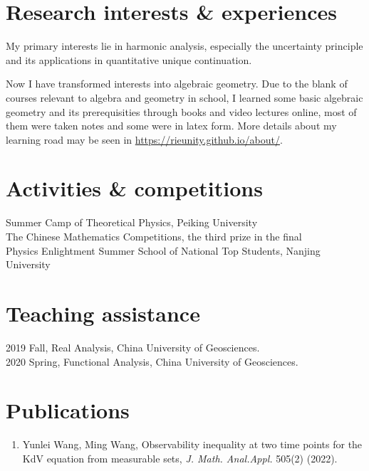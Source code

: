 \documentclass[11pt]{article} %
\begin{document}

\section*{Research interests \& experiences}
My primary interests lie in harmonic analysis, especially the uncertainty principle and its applications in quantitative unique continuation. 

Now I have transformed interests into algebraic geometry. Due to the blank of courses relevant to algebra and geometry in school, I learned some basic algebraic geometry and its prerequisities through books and video lectures online, most of them were taken notes and some were in latex form. More details about my learning road may be seen in \url{https://rieunity.github.io/about/}.

\section*{Activities \& competitions}
 Summer Camp of Theoretical Physics, Peiking University\\
 The Chinese Mathematics Competitions, the third prize  in the final\\
 Physics Enlightment Summer School of National Top Students, Nanjing University


\section*{Teaching assistance}
2019 Fall, Real Analysis, China University of Geosciences. \\
2020 Spring, Functional Analysis, China University of Geosciences.

\section*{Publications}
\begin{enumerate}
\leftskip-0.13in
\item Yunlei Wang, Ming Wang, Observability inequality at two time points for the KdV equation from measurable sets, \emph{J. Math. Anal.Appl.} 505(2) (2022).
\end{enumerate}
\iffalse
\end{document}
